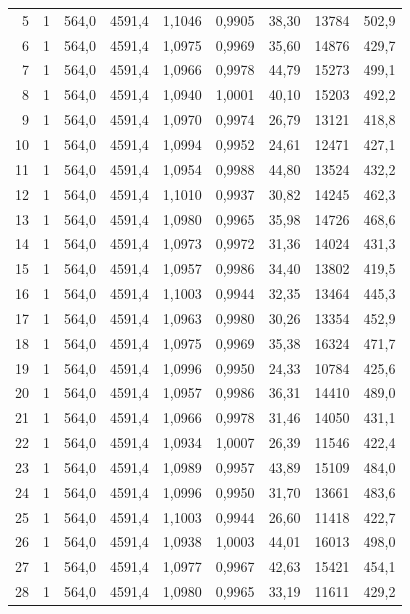 \documentclass[11pt,a4paper]{article}
\begin{document}
{\begin{longtable}{r c r r r r r r r}
5 & 1 & 564,0 & 4591,4 & 1,1046 & 0,9905 & 38,30 & 13784 & 502,9 \\
6 & 1 & 564,0 & 4591,4 & 1,0975 & 0,9969 & 35,60 & 14876 & 429,7 \\
7 & 1 & 564,0 & 4591,4 & 1,0966 & 0,9978 & 44,79 & 15273 & 499,1 \\
8 & 1 & 564,0 & 4591,4 & 1,0940 & 1,0001 & 40,10 & 15203 & 492,2 \\
9 & 1 & 564,0 & 4591,4 & 1,0970 & 0,9974 & 26,79 & 13121 & 418,8 \\
10 & 1 & 564,0 & 4591,4 & 1,0994 & 0,9952 & 24,61 & 12471 & 427,1 \\
11 & 1 & 564,0 & 4591,4 & 1,0954 & 0,9988 & 44,80 & 13524 & 432,2 \\
12 & 1 & 564,0 & 4591,4 & 1,1010 & 0,9937 & 30,82 & 14245 & 462,3 \\
13 & 1 & 564,0 & 4591,4 & 1,0980 & 0,9965 & 35,98 & 14726 & 468,6 \\
14 & 1 & 564,0 & 4591,4 & 1,0973 & 0,9972 & 31,36 & 14024 & 431,3 \\
15 & 1 & 564,0 & 4591,4 & 1,0957 & 0,9986 & 34,40 & 13802 & 419,5 \\
16 & 1 & 564,0 & 4591,4 & 1,1003 & 0,9944 & 32,35 & 13464 & 445,3 \\
17 & 1 & 564,0 & 4591,4 & 1,0963 & 0,9980 & 30,26 & 13354 & 452,9 \\
18 & 1 & 564,0 & 4591,4 & 1,0975 & 0,9969 & 35,38 & 16324 & 471,7 \\
19 & 1 & 564,0 & 4591,4 & 1,0996 & 0,9950 & 24,33 & 10784 & 425,6 \\
20 & 1 & 564,0 & 4591,4 & 1,0957 & 0,9986 & 36,31 & 14410 & 489,0 \\
21 & 1 & 564,0 & 4591,4 & 1,0966 & 0,9978 & 31,46 & 14050 & 431,1 \\
22 & 1 & 564,0 & 4591,4 & 1,0934 & 1,0007 & 26,39 & 11546 & 422,4 \\
23 & 1 & 564,0 & 4591,4 & 1,0989 & 0,9957 & 43,89 & 15109 & 484,0 \\
24 & 1 & 564,0 & 4591,4 & 1,0996 & 0,9950 & 31,70 & 13661 & 483,6 \\
25 & 1 & 564,0 & 4591,4 & 1,1003 & 0,9944 & 26,60 & 11418 & 422,7 \\
26 & 1 & 564,0 & 4591,4 & 1,0938 & 1,0003 & 44,01 & 16013 & 498,0 \\
27 & 1 & 564,0 & 4591,4 & 1,0977 & 0,9967 & 42,63 & 15421 & 454,1 \\
28 & 1 & 564,0 & 4591,4 & 1,0980 & 0,9965 & 33,19 & 11611 & 429,2 \\

\end{longtable}}
\end{document}
